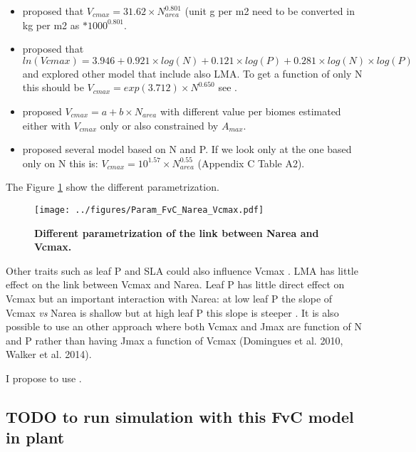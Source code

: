 \documentclass[a4paper,11pt]{article}
\begin{document}
\begin{itemize}

\item \citet{Sakschewski-2015} proposed that $V_{cmax} = 31.62 \times N_{area}^{0.801}$ (unit g per m2 need to be converted in kg per m2 as $*1000^{0.801}$.

\item  \citet{Walker-2014} proposed that $ln(Vcmax) = 3.946 + 0.921 \times log(N) + 0.121 \times log(P) + 0.281 \times log(N) \times log(P)$ and explored other model that include also LMA. To get a function of only N this should be $V_{cmax} = exp(3.712) \times N^{0.650}$ see  \citet{Walker-2017}.

\item \citet{Kattge-2011} proposed $V_{cmax} = a + b \times N_{area}$ with different value per biomes estimated either with $V_{cmax}$ only or also constrained by $A_{max}$.

\item \citet{Domingues-2010} proposed several model based on N and P.  If we look only at the one based only on N this is: $V_{cmax} = 10^{1.57} \times N_{area}^{0.55}$ (Appendix C Table A2).

\end{itemize}

The Figure \ref{fig:Narea_Vcmax} show the different parametrization.

\begin{figure}[ht]
\centering
\texttt{[image: ../figures/Param\_FvC\_Narea\_Vcmax.pdf]}
\caption{\textbf{Different parametrization of the link between Narea and Vcmax.}
\label{fig:Narea_Vcmax}}
\end{figure}

Other traits such as leaf P and SLA could also influence Vcmax \citep{Walker-2014,Domingues-2010}. LMA has little effect on the link between Vcmax and Narea.  Leaf P has little direct effect on Vcmax but an important interaction with Narea: at low leaf P the slope of Vcmax \textit{vs} Narea is shallow but at high leaf P this slope is steeper \citep{Walker-2014}.
It is also possible to use an other approach where both Vcmax and Jmax
are function of N and P rather than having Jmax a function of Vcmax (Domingues et al. 2010, Walker et al. 2014).

I propose to use \citet{Sakschewski-2015}.


\subsection{TODO to run simulation with this FvC model in plant}
\end{document}
